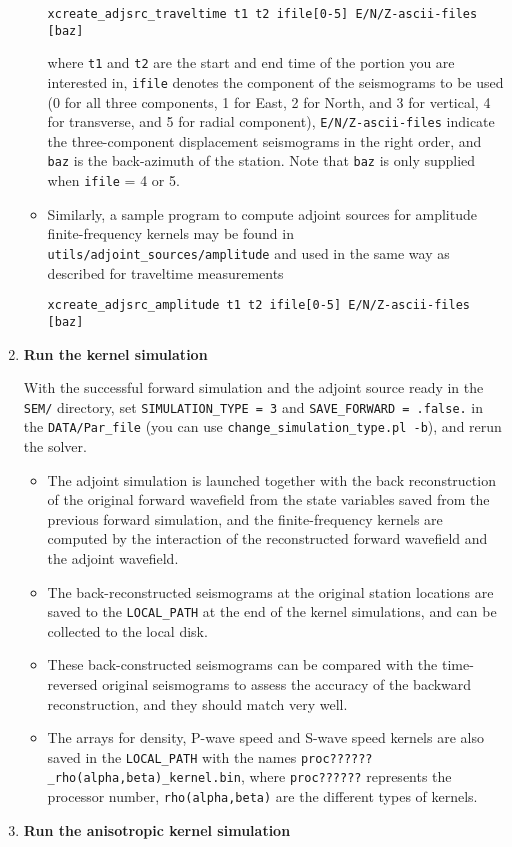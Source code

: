 \begin{enumerate}
\begin{itemize}
\begin{verbatim}
xcreate_adjsrc_traveltime t1 t2 ifile[0-5] E/N/Z-ascii-files [baz]
\end{verbatim}
where \texttt{t1} and \texttt{t2} are the start and end time of the
portion you are interested in, \texttt{ifile} denotes the component
of the seismograms to be used (0 for all three components, 1 for East,
2 for North, and 3 for vertical, 4 for transverse, and 5 for radial
component), \texttt{E/N/Z-ascii-files} indicate the three-component
displacement seismograms in the right order, and \texttt{baz} is the
back-azimuth of the station. Note that \texttt{baz} is only supplied
when \texttt{ifile} = 4 or 5.

\item Similarly, a sample program to compute adjoint sources for amplitude
finite-frequency kernels may be found in \texttt{utils/adjoint\_sources/amplitude}
and used in the same way as described for traveltime measurements
\begin{verbatim}
xcreate_adjsrc_amplitude t1 t2 ifile[0-5] E/N/Z-ascii-files [baz]
\end{verbatim}
\end{itemize}
\item \textbf{Run the kernel simulation}


With the successful forward simulation and the adjoint source ready
in the \texttt{SEM/} directory, set \texttt{SIMULATION\_TYPE
= 3} and \texttt{SAVE\_FORWARD = .false.} in the \texttt{DATA/Par\_file}
(you can use \texttt{change\_simulation\_type.pl -b}), and rerun the
solver.
\begin{itemize}
\item The adjoint simulation is launched together with the back reconstruction
of the original forward wavefield from the state variables saved from
the previous forward simulation, and the finite-frequency kernels
are computed by the interaction of the reconstructed forward wavefield
and the adjoint wavefield.
\item The back-reconstructed seismograms at the original station locations
are saved to the \texttt{LOCAL\_PATH} at the end of the kernel simulations,
and can be collected to the local disk.
\item These back-constructed seismograms can be compared with the time-reversed
original seismograms to assess the accuracy of the backward reconstruction,
and they should match very well.
\item The arrays for density, P-wave speed and S-wave speed kernels are
also saved in the \texttt{LOCAL\_PATH} with the names \texttt{proc??????\_rho(alpha,beta)\_kernel.bin},
where \texttt{proc??????} represents the processor number, \texttt{rho(alpha,beta)}
are the different types of kernels.
\end{itemize}
\item \textbf{Run the anisotropic kernel simulation}



\end{enumerate}
